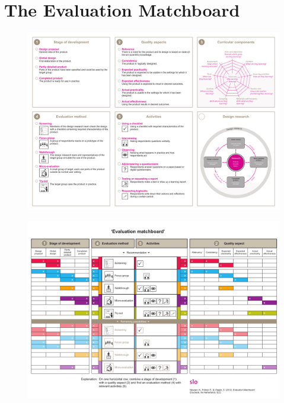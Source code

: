 \documentclass[11pt,twoside]{report} %
\begin{document}
\newpage

\section{The Evaluation Matchboard}
\label{app:evamatchboard}

\begin{figure}[h]
\centering
\includegraphics[angle=90, height=.75\textheight]{Evaluation_matchboard-1}
\end{figure}

\begin{figure}[h]
\centering
\includegraphics[angle=90, height=\textheight]{Evaluation_matchboard-2}
\end{figure}
\end{document}
